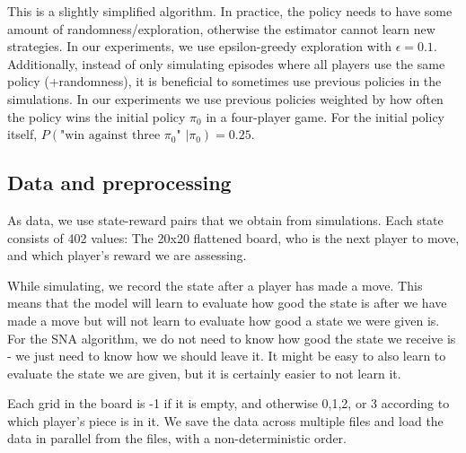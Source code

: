 \documentclass{article}
\begin{document}
This is a slightly simplified algorithm. In practice, the policy needs to have some amount of randomness/exploration, otherwise the estimator cannot learn new strategies. In our experiments, we use epsilon-greedy exploration with $\epsilon=0.1$.
Additionally, instead of only simulating episodes where all players use the same policy (+randomness), it is beneficial to sometimes use previous policies in the simulations. In our experiments we use previous policies weighted by how often the policy wins the initial policy $\pi_0$ in a four-player game. For the initial policy itself, $P(\text{"win against three } \pi_0 \text{" }| \pi_0) = 0.25$.

\subsection{Data and preprocessing}
\label{sec:data-prepocessing}
As data, we use state-reward pairs that we obtain from simulations. Each state consists of 402 values: The 20x20 flattened board, who is the next player to move, and which player's reward we are assessing.

While simulating, we record the state after a player has made a move. This means that the model will learn to evaluate how good the state is after we have made a move but will not learn to evaluate how good a state we were given is. For the SNA algorithm, we do not need to know how good the state we receive is - we just need to know how we should leave it. It might be easy to also learn to evaluate the state we are given, but it is certainly easier to not learn it.

Each grid in the board is -1 if it is empty, and otherwise 0,1,2, or 3 according to which player's piece is in it.
We save the data across multiple files and load the data in parallel from the files, with a non-deterministic order.
\end{document}
